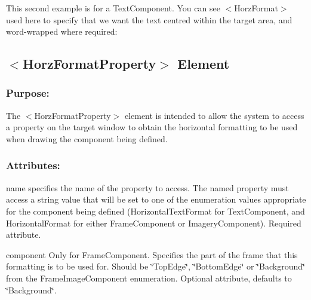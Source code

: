 This second example is for a Text\+Component. You can see {\ttfamily $<$Horz\+Format$>$} used here to specify that we want the text centred within the target area, and word-\/wrapped where required\+: 
\begin{DoxyCode}{0}
\end{DoxyCode}
\hypertarget{fal_element_ref_fal_elem_ref_sec_17}{}\subsection{$<$\+Horz\+Format\+Property$>$ Element}\label{fal_element_ref_fal_elem_ref_sec_17}
\hypertarget{fal_element_ref_fal_elem_ref_sec_17_1}{}\subsubsection{Purpose\+:}\label{fal_element_ref_fal_elem_ref_sec_17_1}
The {\ttfamily $<$Horz\+Format\+Property$>$} element is intended to allow the system to access a property on the target window to obtain the horizontal formatting to be used when drawing the component being defined.\hypertarget{fal_element_ref_fal_elem_ref_sec_17_2}{}\subsubsection{Attributes\+:}\label{fal_element_ref_fal_elem_ref_sec_17_2}
\begin{DoxyItemize}
\item {\ttfamily name} specifies the name of the property to access. The named property must access a string value that will be set to one of the enumeration values appropriate for the component being defined (Horizontal\+Text\+Format for Text\+Component, and Horizontal\+Format for either Frame\+Component or Imagery\+Component). Required attribute. \item {\ttfamily component} Only for Frame\+Component. Specifies the part of the frame that this formatting is to be used for. Should be \char`\"{}\+Top\+Edge\char`\"{}, \char`\"{}\+Bottom\+Edge\char`\"{} or \char`\"{}\+Background\char`\"{} from the Frame\+Image\+Component enumeration. Optional attribute, defaults to \char`\"{}\+Background\char`\"{}.\end{DoxyItemize}
